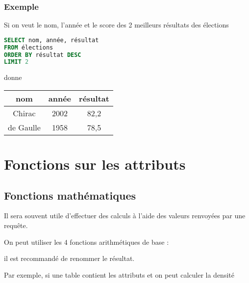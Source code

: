 \subsubsection{Exemple}
Si on veut le nom, l'année et le score des 2 meilleurs résultats des élections
\begin{lstlisting}[language=SQL]
SELECT nom, année, résultat
FROM élections
ORDER BY résultat DESC
LIMIT 2
\end{lstlisting}
donne
\begin{center}
\begin{tabular}{|c|c|c|}
\hline
{\bf nom} & {\bf année} & {\bf résultat} \\
  \hline
Chirac & 2002 & 82,2 \\
de Gaulle & 1958 & 78,5 \\
\hline
\end{tabular}
\end{center}
\section{Fonctions sur les attributs}
\subsection{Fonctions mathématiques}
Il sera souvent utile d'effectuer des calculs à l'aide des valeurs renvoyées par une requête.

On peut utiliser les 4 fonctions arithmétiques de base : \type{+, -, *, /}

il est recommandé de renommer le résultat.

Par exemple, si une table contient les attributs  et  on peut calculer la densité


